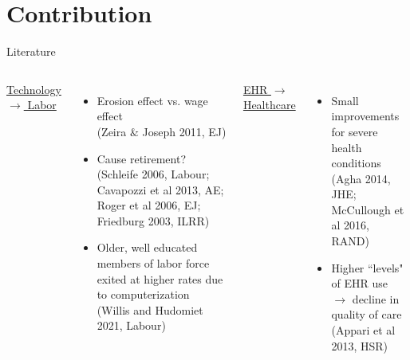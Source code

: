 \documentclass[10pt]{beamer}
\begin{document}
\section{Contribution}

\begin{frame}{Literature}
\small
\begin{columns}
\setlength{\tabcolsep}{-5pt}
        \centering
        \underline{ Technology $\rightarrow$ Labor }
        \vspace{-1mm}
        \begin{itemize}
            \item Erosion effect vs. wage effect \\ \vspace{1mm}
            \tiny (Zeira $\&$ Joseph 2011, EJ)
            
            \footnotesize
            
            \item Cause retirement? \\ \vspace{1mm}
            \tiny (Schleife 2006, Labour; Cavapozzi et al 2013, AE; Roger et al 2006, EJ; Friedburg 2003, ILRR)
            
            \footnotesize
            
            \item Older, well educated members of labor force exited at higher rates due to computerization \\ \vspace{1mm}
            \tiny (Willis and Hudomiet 2021, Labour)
        \end{itemize}
        
        
        \centering
        \color{gray}
        \underline{ EHR $\rightarrow$ Healthcare }
        \vspace{-1mm}
        \begin{itemize}
        \color{gray}
            \item Small improvements for severe health conditions \\ \vspace{1mm}
            \tiny(Agha 2014, JHE; McCullough et al 2016, RAND)
            
            \footnotesize
            
            \item Higher ``levels" of EHR use $\rightarrow$ decline in quality of care\\ \vspace{1mm}
            \tiny (Appari et al 2013, HSR)
            

\end{itemize}
\end{columns}
\end{frame}
\end{document}
